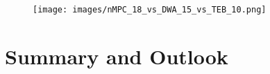 \documentclass[conference]{IEEEtran}
\begin{document}
\begin{figure}[!h]
    \centering
    \texttt{[image: images/nMPC\_18\_vs\_DWA\_15\_vs\_TEB\_10.png]}
    \caption{ }
    \label{fig:nMPC_16_vs_DWA_12_vs_TEB_6_Path}
\end{figure}


\section{Summary and Outlook}



{\small


}


\clearpage 
\end{document}

